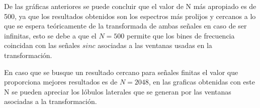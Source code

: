 \begin{enumerate}
De las gráficas anteriores se puede concluir que el valor de N más apropiado es de 500, ya que los resultados obtenidos son los espectros más prolijos y cercanos a lo que se espera teóricamente de la transformada de ambas señales en caso de ser infinitas, esto se debe a que el $N=500$ permite que los bines de frecuencia  coincidan con las señales $sinc $ asociadas a las ventanas usadas en la transformación. 

En caso que se busque un resultado cercano para señales finitas el valor que proporciona mejores resultados es de $N = 2048$, en las graficas obtenidas con este N se pueden apreciar los lóbulos laterales que se generan por las ventanas asociadas a la transformación.





\end{enumerate}